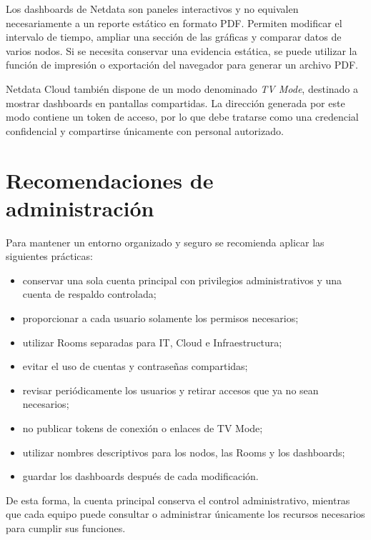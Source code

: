 Los dashboards de Netdata son paneles interactivos y no equivalen necesariamente a un
reporte estático en formato PDF. Permiten modificar el intervalo de tiempo, ampliar una
sección de las gráficas y comparar datos de varios nodos. Si se necesita conservar una
evidencia estática, se puede utilizar la función de impresión o exportación del navegador
para generar un archivo PDF.

Netdata Cloud también dispone de un modo denominado \textit{TV Mode}, destinado a
mostrar dashboards en pantallas compartidas. La dirección generada por este modo
contiene un token de acceso, por lo que debe tratarse como una credencial confidencial y
compartirse únicamente con personal autorizado.



\section{Recomendaciones de administración}

Para mantener un entorno organizado y seguro se recomienda aplicar las siguientes
prácticas:

\begin{itemize}
    \item conservar una sola cuenta principal con privilegios administrativos y una
          cuenta de respaldo controlada;
    \item proporcionar a cada usuario solamente los permisos necesarios;
    \item utilizar Rooms separadas para IT, Cloud e Infraestructura;
    \item evitar el uso de cuentas y contraseñas compartidas;
    \item revisar periódicamente los usuarios y retirar accesos que ya no sean
          necesarios;
    \item no publicar tokens de conexión o enlaces de TV Mode;
    \item utilizar nombres descriptivos para los nodos, las Rooms y los dashboards;
    \item guardar los dashboards después de cada modificación.
\end{itemize}

De esta forma, la cuenta principal conserva el control administrativo, mientras que cada
equipo puede consultar o administrar únicamente los recursos necesarios para cumplir
sus funciones.